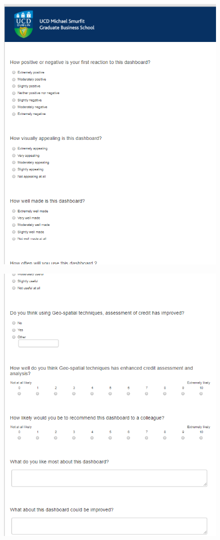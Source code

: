 \begin{center}
\begin{figure}[!htb]
\includegraphics[scale=0.6]{ques1.png}
\centering
\label{fig:git}
\end{figure}
\end{center}

\begin{center}
\begin{figure}[!htb]
\includegraphics[scale=0.6]{ques2.png}
\centering
\label{fig:git}
\end{figure}
\end{center}
